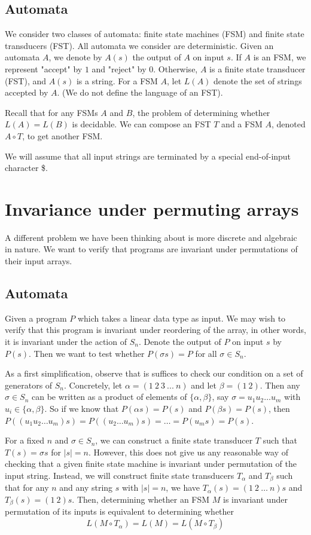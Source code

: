 \documentclass{llncs}
\begin{document}
\subsection{Automata}
We consider two classes of automata: finite state machines (FSM) and finite state transducers (FST). All automata we consider are deterministic. Given an automata $A$, we denote by $A(s)$ the output of $A$ on input $s$. If $A$ is an FSM, we represent "accept" by $1$ and "reject" by $0$. Otherwise, $A$ is a finite state transducer (FST), and $A(s)$ is a string. For a FSM $A$, let $L(A)$ denote the set of strings accepted by $A$. (We do not define the language of an FST).

Recall that for any FSMs $A$ and $B$, the problem of determining whether $L(A) = L(B)$ is decidable. We can compose an FST $T$ and a FSM $A$, denoted $A \circ T$, to get another FSM. 

We will assume that all input strings are terminated by a special end-of-input character \$.

\section{Invariance under permuting arrays}

A different problem we have been thinking about is more discrete and  algebraic in nature. We want to verify that programs are invariant under permutations of their input arrays.

\subsection{Automata}
Given a program $P$ which takes a linear data type
as input. We may wish to verify that this program
is invariant under reordering of the array,
in other words, it is invariant under the action of $S_n$.
Denote the output of $P$ on input $s$ by $P(s)$.
Then we want to test whether $P(\sigma s) = P$
for all $\sigma \in S_n$.

As a first simplification, observe that is
suffices to check our condition on a set
of generators of $S_n$.
Concretely, let $\alpha = (1\ 2\ 3\ ...\ n)$
and let $\beta = (1\ 2)$.
Then any $\sigma \in S_n$ can be written as
a product of elements of $\{\alpha,\beta\}$,
say $\sigma = u_1 u_2\ldots u_m$ with
$u_i \in \{\alpha,\beta\}$.
So if we know that $P(\alpha s) = P(s)$
and $P(\beta s) = P(s)$, then
$P((u_1 u_2 \ldots u_m)s)
= P((u_2 \ldots u_m)s)
= \ldots = P(u_ms) = P(s) $.

For a fixed $n$ and $\sigma \in S_n$,
we can construct a finite state transducer
$T$ such that $T(s) = \sigma s$ for $|s|=n$.
However, this does not give us any
reasonable way of checking that a given
finite state machine is invariant under permutation
of the input string.
Instead, we will construct finite state
transducers $T_{\alpha}$ and $T_{\beta}$
such that for any $n$ and any string $s$ 
with $|s|=n$, we have 
$T_{\alpha}(s)=(1\ 2\ \ldots\ n) s$ and
$T_{\beta}(s) = (1\ 2) s$.
Then, determining whether an FSM $M$ is
invariant under permutation of its inputs
is equivalent to determining whether
\[ 
  L(M \circ T_\alpha) = L(M) = L(M \circ T_\beta)
\]
\end{document}
